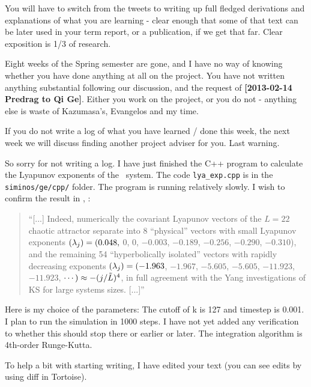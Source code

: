 \begin{description}
You will have to switch from the tweets to writing up full fledged
derivations and explanations of what you are learning - clear enough
that some of that text can be later used in your term report, or a
publication, if we get that far. Clear exposition is 1/3 of research.

\item[2013-02-22 Predrag to Qi Ge] Eight weeks of the Spring semester
are gone, and I have no way of knowing whether you have done anything
at all on the project. You have not written anything substantial
following our discussion, and the request  of {\bf [2013-02-14
Predrag to Qi Ge]}. Either you work on the project, or you do not -
anything else is waste of Kazumasa's, Evangelos and my time.

If you do not write a log of what you have learned / done this week,
the next week we will discuss finding another project adviser for
you. Last warning.

\item[2013-02-22 Qi Ge] So sorry for not writing a log. I have just
finished the C++ program to calculate the Lyapunov exponents of the
\KS\ system. The code \texttt{lya\_exp.cpp} is in the
\texttt{siminos/ge/cpp/} folder. The program is running relatively
slowly. I wish to confirm the result in ,
:

\begin{quote}
``[...] Indeed, numerically the covariant Lyapunov
vectors of the $L=22$ chaotic attractor separate
into 8 ``physical'' vectors with small Lyapunov exponents
$(\lambda_j) = (0.048,$ 0, 0, $-0.003$, $-0.189$, $-0.256$,
$-0.290$, $-0.310$),
and the remaining 54 ``hyperbolically isolated'' vectors with rapidly
decreasing exponents
$(\lambda_j) = (-1.963$,   $-1.967$,   $-5.605$,   $-5.605$,  $-11.923$,  $-11.923$,
 $\cdots) \approx -(j/\tilde{L})^4$,
in full agreement with the Yang \etal{} investigations
of KS for large systems sizes.
 [...]''
\end{quote}

    Here is my choice of the parameters:
    The cutoff of k is 127 and timestep is 0.001. I plan to run the
    simulation in 1000 steps. I have not yet added any
    verification to whether this should stop there or earlier or
    later. The integration algorithm is 4th-order Runge-Kutta.

\item[2013-02-22 Predrag] To help a bit with starting writing, I have
edited your text (you can see edits by using diff in Tortoise).


\end{description}
